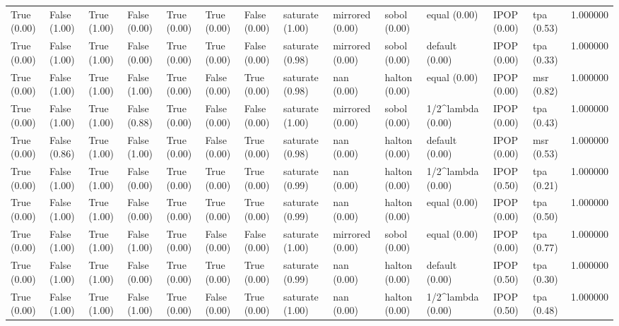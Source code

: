 \begin{tabular}{lllllllllllllr}
True (0.00) & False (1.00) & True (1.00) & False (0.00) & True (0.00) & True (0.00) & False (0.00) & saturate (1.00) & mirrored (0.00) & sobol (0.00) & equal (0.00) & IPOP (0.00) & tpa (0.53) & 1.000000 \\
True (0.00) & False (1.00) & True (1.00) & False (0.00) & True (0.00) & True (0.00) & False (0.00) & saturate (0.98) & mirrored (0.00) & sobol (0.00) & default (0.00) & IPOP (0.00) & tpa (0.33) & 1.000000 \\
True (0.00) & False (1.00) & True (1.00) & False (1.00) & True (0.00) & False (0.00) & True (0.00) & saturate (0.98) & nan (0.00) & halton (0.00) & equal (0.00) & IPOP (0.00) & msr (0.82) & 1.000000 \\
True (0.00) & False (1.00) & True (1.00) & False (0.88) & True (0.00) & False (0.00) & False (0.00) & saturate (1.00) & mirrored (0.00) & sobol (0.00) & 1/2^lambda (0.00) & IPOP (0.00) & tpa (0.43) & 1.000000 \\
True (0.00) & False (0.86) & True (1.00) & False (1.00) & True (0.00) & False (0.00) & True (0.00) & saturate (0.98) & nan (0.00) & halton (0.00) & default (0.00) & IPOP (0.00) & msr (0.53) & 1.000000 \\
True (0.00) & False (1.00) & True (1.00) & False (0.00) & True (0.00) & True (0.00) & True (0.00) & saturate (0.99) & nan (0.00) & halton (0.00) & 1/2^lambda (0.00) & IPOP (0.50) & tpa (0.21) & 1.000000 \\
True (0.00) & False (1.00) & True (1.00) & False (0.00) & True (0.00) & True (0.00) & True (0.00) & saturate (0.99) & nan (0.00) & halton (0.00) & equal (0.00) & IPOP (0.00) & tpa (0.50) & 1.000000 \\
True (0.00) & False (1.00) & True (1.00) & False (1.00) & True (0.00) & False (0.00) & False (0.00) & saturate (1.00) & mirrored (0.00) & sobol (0.00) & equal (0.00) & IPOP (0.00) & tpa (0.77) & 1.000000 \\
True (0.00) & False (1.00) & True (1.00) & False (0.00) & True (0.00) & True (0.00) & True (0.00) & saturate (0.99) & nan (0.00) & halton (0.00) & default (0.00) & IPOP (0.50) & tpa (0.30) & 1.000000 \\
True (0.00) & False (1.00) & True (1.00) & False (1.00) & True (0.00) & False (0.00) & True (0.00) & saturate (1.00) & nan (0.00) & halton (0.00) & 1/2^lambda (0.00) & IPOP (0.50) & tpa (0.48) & 1.000000 \\
\bottomrule
\end{tabular}
